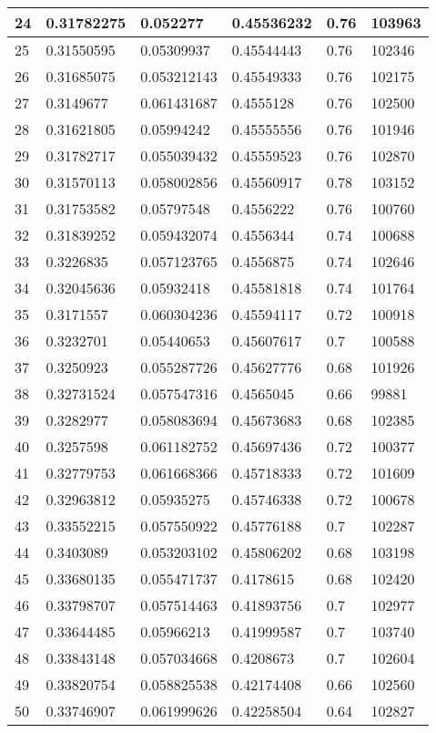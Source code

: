 \begin{longtable}{|l|l|l|l|l|l|}
24 & 0.31782275 & 0.052277 & 0.45536232 & 0.76 & 103963 \\ \hline 
25 & 0.31550595 & 0.05309937 & 0.45544443 & 0.76 & 102346 \\ \hline 
26 & 0.31685075 & 0.053212143 & 0.45549333 & 0.76 & 102175 \\ \hline 
27 & 0.3149677 & 0.061431687 & 0.4555128 & 0.76 & 102500 \\ \hline 
28 & 0.31621805 & 0.05994242 & 0.45555556 & 0.76 & 101946 \\ \hline 
29 & 0.31782717 & 0.055039432 & 0.45559523 & 0.76 & 102870 \\ \hline 
30 & 0.31570113 & 0.058002856 & 0.45560917 & 0.78 & 103152 \\ \hline 
31 & 0.31753582 & 0.05797548 & 0.4556222 & 0.76 & 100760 \\ \hline 
32 & 0.31839252 & 0.059432074 & 0.4556344 & 0.74 & 100688 \\ \hline 
33 & 0.3226835 & 0.057123765 & 0.4556875 & 0.74 & 102646 \\ \hline 
34 & 0.32045636 & 0.05932418 & 0.45581818 & 0.74 & 101764 \\ \hline 
35 & 0.3171557 & 0.060304236 & 0.45594117 & 0.72 & 100918 \\ \hline 
36 & 0.3232701 & 0.05440653 & 0.45607617 & 0.7 & 100588 \\ \hline 
37 & 0.3250923 & 0.055287726 & 0.45627776 & 0.68 & 101926 \\ \hline 
38 & 0.32731524 & 0.057547316 & 0.4565045 & 0.66 & 99881 \\ \hline 
39 & 0.3282977 & 0.058083694 & 0.45673683 & 0.68 & 102385 \\ \hline 
40 & 0.3257598 & 0.061182752 & 0.45697436 & 0.72 & 100377 \\ \hline 
41 & 0.32779753 & 0.061668366 & 0.45718333 & 0.72 & 101609 \\ \hline 
42 & 0.32963812 & 0.05935275 & 0.45746338 & 0.72 & 100678 \\ \hline 
43 & 0.33552215 & 0.057550922 & 0.45776188 & 0.7 & 102287 \\ \hline 
44 & 0.3403089 & 0.053203102 & 0.45806202 & 0.68 & 103198 \\ \hline 
45 & 0.33680135 & 0.055471737 & 0.4178615 & 0.68 & 102420 \\ \hline 
46 & 0.33798707 & 0.057514463 & 0.41893756 & 0.7 & 102977 \\ \hline 
47 & 0.33644485 & 0.05966213 & 0.41999587 & 0.7 & 103740 \\ \hline 
48 & 0.33843148 & 0.057034668 & 0.4208673 & 0.7 & 102604 \\ \hline 
49 & 0.33820754 & 0.058825538 & 0.42174408 & 0.66 & 102560 \\ \hline 
50 & 0.33746907 & 0.061999626 & 0.42258504 & 0.64 & 102827 \\ \hline 
\end{longtable}